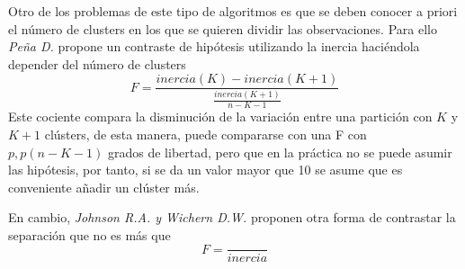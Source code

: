 \noindent Otro de los problemas de este tipo de algoritmos es que se deben conocer a priori el número de clusters en los que se quieren dividir las observaciones. Para ello \emph{Peña D.}\cite{Peña 2002} propone un contraste de hipótesis  utilizando la inercia haciéndola depender del número de clusters
\begin{equation}
F=\dfrac{inercia(K)-inercia(K+1)}{\frac{inercia(K+1)}{n-K-1}}
\end{equation}
Este cociente compara la disminución de la variación entre una partición con $K$ y $K+1$ clústers, de esta manera, puede compararse con una F con $p,p(n-K-1)$ grados de libertad, pero que en la práctica no se puede asumir las hipótesis, por tanto,  si se da un valor mayor que 10 se asume que es conveniente añadir un clúster más. 

\noindent En cambio, \emph{Johnson R.A. y Wichern D.W.}\cite{Johnson 2007} proponen otra forma de contrastar la separación que no es más que 
\begin{equation}
F=\dfrac{}{inercia} 
\end{equation}

